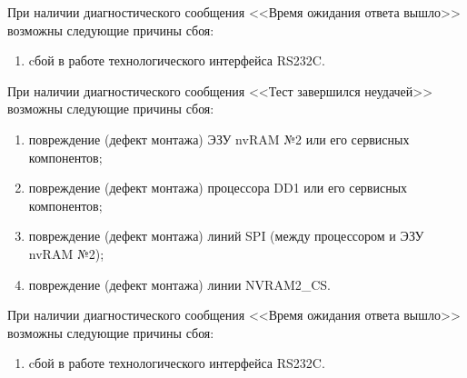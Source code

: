     \subpoint При наличии диагностического сообщения <<Время ожидания ответа вышло>> возможны следующие причины сбоя:
      \begin{enumerate}
	\item cбой в работе технологического интерфейса RS232C.
      \end{enumerate}   
      
    \subpoint При наличии диагностического сообщения <<Тест завершился неудачей>> возможны следующие причины сбоя:
      \begin{enumerate}
	\item повреждение (дефект монтажа) ЭЗУ nvRAM №2 или его сервисных компонентов;
	\item повреждение (дефект монтажа) процессора DD1 или его сервисных компонентов;
	\item повреждение (дефект монтажа) линий SPI (между процессором и ЭЗУ nvRAM №2);
	\item повреждение (дефект монтажа) линии NVRAM2\_CS.
      \end{enumerate}
      
    \subpoint При наличии диагностического сообщения <<Время ожидания ответа вышло>> возможны следующие причины сбоя:
      \begin{enumerate}
	\item cбой в работе технологического интерфейса RS232C.
      \end{enumerate}   
      
